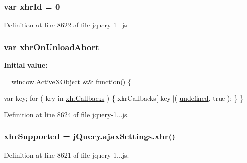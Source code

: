 \subsubsection[{\texorpdfstring{xhr\+Id}{xhrId}}]{\setlength{\rightskip}{0pt plus 5cm}var xhr\+Id = 0}\hypertarget{_scripts_2jquery-1_810_82_8js_aa23ed64cf7afc9b028419517bf23fcea}{}\label{_scripts_2jquery-1_810_82_8js_aa23ed64cf7afc9b028419517bf23fcea}


Definition at line 8622 of file jquery-\/1...\+js.

\subsubsection[{\texorpdfstring{xhr\+On\+Unload\+Abort}{xhrOnUnloadAbort}}]{\setlength{\rightskip}{0pt plus 5cm}var xhr\+On\+Unload\+Abort}\hypertarget{_scripts_2jquery-1_810_82_8js_a271c099ab18ab35c15cac2faa2a097aa}{}\label{_scripts_2jquery-1_810_82_8js_a271c099ab18ab35c15cac2faa2a097aa}
{\bfseries Initial value\+:}
\begin{DoxyCode}
= \hyperlink{obj_2_release_2_package_2_package_tmp_2_scripts_2jquery-1_810_82_8js_a04a8a2bbfa9c15500892b8e5033d625b}{window}.ActiveXObject && \textcolor{keyword}{function}() \{
        
        var key;
        \textcolor{keywordflow}{for} ( key in \hyperlink{obj_2_release_2_package_2_package_tmp_2_scripts_2jquery-1_810_82_8js_a068f27a70831ff3a9e0ffa79e063847f}{xhrCallbacks} ) \{
            xhrCallbacks[ key ]( \hyperlink{obj_2_release_2_package_2_package_tmp_2_scripts_2jquery-1_810_82_8js_a08113a236cc18d2a9d5ce27e638012be}{undefined}, true );
        \}
    \}
\end{DoxyCode}


Definition at line 8624 of file jquery-\/1...\+js.

\subsubsection[{\texorpdfstring{xhr\+Supported}{xhrSupported}}]{\setlength{\rightskip}{0pt plus 5cm}xhr\+Supported = {\bf j\+Query.\+ajax\+Settings.\+xhr}()}\hypertarget{_scripts_2jquery-1_810_82_8js_afd7e72f2f357a5a8b17e46776a6283eb}{}\label{_scripts_2jquery-1_810_82_8js_afd7e72f2f357a5a8b17e46776a6283eb}


Definition at line 8621 of file jquery-\/1...\+js.

